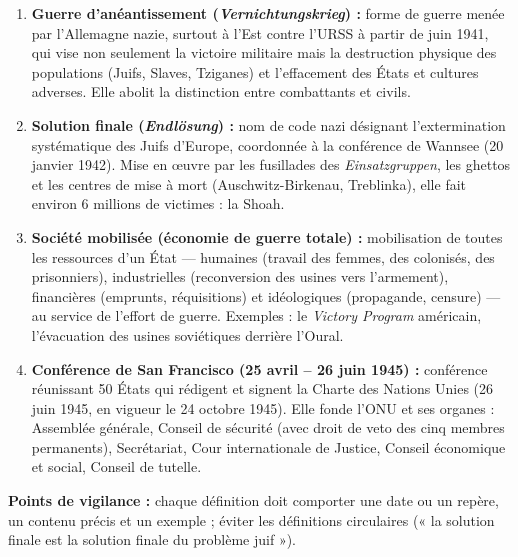 \documentclass[11pt]{article}
\begin{document}
\begin{corrige}
\begin{enumerate}
\item \textbf{Guerre d'anéantissement (\emph{Vernichtungskrieg}) :} forme de guerre menée par l'Allemagne nazie, surtout à l'Est contre l'URSS à partir de juin 1941, qui vise non seulement la victoire militaire mais la destruction physique des populations (Juifs, Slaves, Tziganes) et l'effacement des États et cultures adverses. Elle abolit la distinction entre combattants et civils.
\item \textbf{Solution finale (\emph{Endlösung}) :} nom de code nazi désignant l'extermination systématique des Juifs d'Europe, coordonnée à la conférence de Wannsee (20 janvier 1942). Mise en œuvre par les fusillades des \emph{Einsatzgruppen}, les ghettos et les centres de mise à mort (Auschwitz-Birkenau, Treblinka), elle fait environ 6 millions de victimes : la Shoah.
\item \textbf{Société mobilisée (économie de guerre totale) :} mobilisation de toutes les ressources d'un État --- humaines (travail des femmes, des colonisés, des prisonniers), industrielles (reconversion des usines vers l'armement), financières (emprunts, réquisitions) et idéologiques (propagande, censure) --- au service de l'effort de guerre. Exemples : le \emph{Victory Program} américain, l'évacuation des usines soviétiques derrière l'Oural.
\item \textbf{Conférence de San Francisco (25 avril -- 26 juin 1945) :} conférence réunissant 50 États qui rédigent et signent la Charte des Nations Unies (26 juin 1945, en vigueur le 24 octobre 1945). Elle fonde l'ONU et ses organes : Assemblée générale, Conseil de sécurité (avec droit de veto des cinq membres permanents), Secrétariat, Cour internationale de Justice, Conseil économique et social, Conseil de tutelle.
\end{enumerate}
\textbf{Points de vigilance :} chaque définition doit comporter une date ou un repère, un contenu précis et un exemple ; éviter les définitions circulaires (« la solution finale est la solution finale du problème juif »).
\end{corrige}
\end{document}
